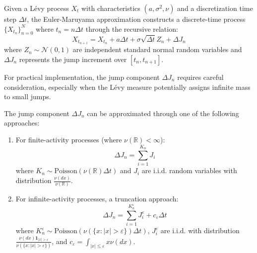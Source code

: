 \begin{definition}
Given a Lévy process $X_t$ with characteristics $(a, \sigma^2, \nu)$ and a discretization time step $\Delta t$, the Euler-Maruyama approximation constructs a discrete-time process $\{X_{t_n}\}_{n=0}^N$ where $t_n = n\Delta t$ through the recursive relation:
\begin{equation}
    X_{t_{n+1}} = X_{t_n} + a\Delta t + \sigma\sqrt{\Delta t}Z_n + \Delta J_n
\end{equation}
where $Z_n \sim \mathcal{N}(0,1)$ are independent standard normal random variables and $\Delta J_n$ represents the jump increment over $[t_n, t_{n+1}]$.
\end{definition}

For practical implementation, the jump component $\Delta J_n$ requires careful consideration, especially when the Lévy measure potentially assigns infinite mass to small jumps.

\begin{proposition}
The jump component $\Delta J_n$ can be approximated through one of the following approaches:
\begin{enumerate}
    \item For finite-activity processes (where $\nu(\mathbb{R}) < \infty$):
    \begin{equation}
        \Delta J_n = \sum_{i=1}^{K_n} J_i
    \end{equation}
    where $K_n \sim \text{Poisson}(\nu(\mathbb{R})\Delta t)$ and $J_i$ are i.i.d. random variables with distribution $\frac{\nu(dx)}{\nu(\mathbb{R})}$.
    
    \item For infinite-activity processes, a truncation approach:
    \begin{equation}
        \Delta J_n = \sum_{i=1}^{K^{\varepsilon}_n} J^{\varepsilon}_i + c_{\varepsilon}\Delta t
    \end{equation}
    where $K^{\varepsilon}_n \sim \text{Poisson}(\nu(\{x: |x| > \varepsilon\})\Delta t)$, $J^{\varepsilon}_i$ are i.i.d. with distribution $\frac{\nu(dx)\mathbf{1}_{|x|>\varepsilon}}{\nu(\{x: |x| > \varepsilon\})}$, and $c_{\varepsilon} = \int_{|x|\leq\varepsilon} x\nu(dx)$.
\end{enumerate}
\end{proposition}

